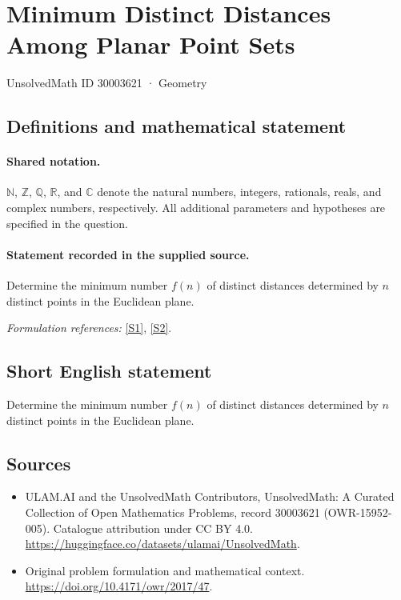 \documentclass[11pt]{article}
\newcommand{\sref}[2]{\hyperlink{source:#1:#2}{[S#2]}}
\begin{document}
\setcounter{section}{30003620}
\section{Minimum Distinct Distances Among Planar Point Sets}\label{30003621}
{\small UnsolvedMath ID 30003621 · Geometry}
\subsection{Definitions and mathematical statement}

\paragraph{Shared notation.}$\mathbb N$, $\mathbb Z$, $\mathbb Q$, $\mathbb R$, and $\mathbb C$ denote the natural numbers, integers, rationals, reals, and complex numbers, respectively. All additional parameters and hypotheses are specified in the question.


\paragraph{Statement recorded in the supplied source.}
Determine the minimum number $f(n)$ of distinct distances determined by $n$ distinct points in the Euclidean plane.
\par\smallskip\textit{Formulation references:} \sref{30003621}{1}, \sref{30003621}{2}.
\subsection{Short English statement}
Determine the minimum number $f(n)$ of distinct distances determined by $n$ distinct points in the Euclidean plane.
\subsection{Sources}
\begin{itemize}
\item[\hypertarget{source:30003621:1}{S1}] ULAM.AI and the UnsolvedMath Contributors, UnsolvedMath: A Curated Collection of Open Mathematics Problems, record 30003621 (OWR-15952-005). Catalogue attribution under CC BY 4.0.
\url{https://huggingface.co/datasets/ulamai/UnsolvedMath}.
\item[\hypertarget{source:30003621:2}{S2}] Original problem formulation and mathematical context.
\url{https://doi.org/10.4171/owr/2017/47}.
\end{itemize}
\label{end:30003621}
\end{document}
